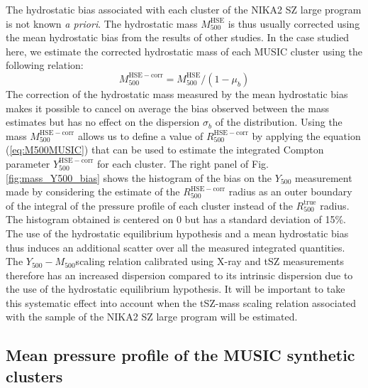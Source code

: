 \documentclass[twocolumn,traditabstract]{aa}
\begin{document}
The hydrostatic bias associated with each cluster of the NIKA2 SZ large program is not known \emph{a priori}. The hydrostatic mass $M_{500}^{\mathrm{HSE}}$ is thus usually corrected using the mean hydrostatic bias from the results of other studies. In the case studied here, we estimate the corrected hydrostatic mass of each MUSIC cluster using the following relation:
\begin{equation}
M_{500}^{\mathrm{HSE-corr}} = M_{500}^{\mathrm{HSE}} / (1 - \mu_b)
\end{equation}
The correction of the hydrostatic mass measured by the mean hydrostatic bias makes it possible to cancel on average the bias observed between the mass estimates but has no effect on the dispersion $\sigma_b$ of the distribution. Using the mass $M_{500}^{\mathrm{HSE-corr}}$ allows us to define a value of $R_{500}^{\mathrm{HSE-corr}}$ by applying the equation (\ref{eq:M500MUSIC}) that can be used to estimate the integrated Compton parameter $Y_{500}^{\mathrm{HSE-corr}}$ for each cluster. The right panel of Fig. \ref{fig:mass_Y500_bias} shows the histogram of the bias on the $Y_{500}$ measurement made by considering the estimate of the $R_{500}^{\mathrm{HSE-corr}}$ radius as an outer boundary of the integral of the pressure profile of each cluster instead of the $R_{500}^{\mathrm{true}}$ radius. The histogram obtained is centered on 0 but has a standard deviation of 15\%. The use of the hydrostatic equilibrium hypothesis and a mean hydrostatic bias thus induces an additional scatter over all the measured integrated quantities. The $Y_{500}{-}M_{500}$scaling relation calibrated using X-ray and tSZ measurements therefore has an increased dispersion compared to its intrinsic dispersion due to the use of the hydrostatic equilibrium hypothesis. It will be important to take this systematic effect into account when the tSZ-mass scaling relation associated with the sample of the NIKA2 SZ large program will be estimated.

\subsection{Mean pressure profile of the MUSIC synthetic clusters}\label{subsec:music_prof}
\end{document}
